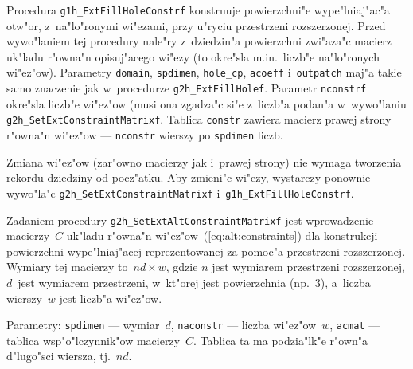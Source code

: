 \vspace{\bigskipamount}
\begin{sloppypar}
Procedura \texttt{g1h\_ExtFillHoleConstrf} konstruuje powierzchni"e wype"lniaj"ac"a
otw"or, z~na"lo"ronymi wi"ezami, przy u"ryciu przestrzeni rozszerzonej.
Przed wywo"laniem tej procedury nale"ry z~dziedzin"a powierzchni zwi"aza"c
macierz uk"ladu r"owna"n opisuj"acego wi"ezy (to okre"sla m.in.\ liczb"e
na"lo"ronych wi"ez"ow). Parametry \texttt{domain}, \texttt{spdimen},
\texttt{hole\_cp}, \texttt{acoeff} i~\texttt{outpatch} maj"a takie samo znaczenie
jak w~procedurze \texttt{g2h\_ExtFillHolef}. Parametr \texttt{nconstrf} okre"sla
liczb"e wi"ez"ow (musi ona zgadza"c si"e z~liczb"a podan"a w~wywo"laniu
\texttt{g2h\_SetExtConstraintMatrixf}. Tablica \texttt{constr} zawiera
macierz prawej strony r"owna"n wi"ez"ow --- \texttt{nconstr} wierszy po
\texttt{spdimen} liczb.%
\end{sloppypar}

Zmiana wi"ez"ow (zar"owno macierzy jak i~prawej strony) nie wymaga tworzenia
rekordu dziedziny od pocz"atku. Aby zmieni"c wi"ezy, wystarczy ponownie
wywo"la"c \texttt{g2h\_SetExtConstraintMatrixf} i~\texttt{g1h\_ExtFillHoleConstrf}.

\vspace{\bigskipamount}
\begin{sloppypar}
Zadaniem procedury \texttt{g2h\_SetExtAltConstraintMatrixf} jest wprowadzenie
macierzy~$C$ uk"ladu r"owna"n wi"ez"ow~(\ref{eq:alt:constraints}) dla konstrukcji
powierzchni wype"lniaj"acej reprezentowanej za pomoc"a przestrzeni rozszerzonej.
Wymiary tej macierzy to~$nd\times w$, gdzie $n$ jest wymiarem przestrzeni
rozszerzonej, $d$~jest wymiarem przestrzeni, w~kt"orej jest powierzchnia
(np.~$3$), a~liczba wierszy~$w$ jest liczb"a wi"ez"ow.%
\end{sloppypar}

Parametry: \texttt{spdimen} --- wymiar~$d$, \texttt{naconstr} --- liczba
wi"ez"ow~$w$, \texttt{acmat} --- tablica wsp"o"lczynnik"ow macierzy~$C$.
Tablica ta ma podzia"lk"e r"own"a d"lugo"sci wiersza, tj.~$nd$.

